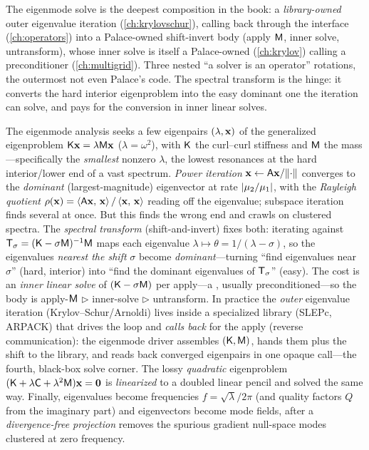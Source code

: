\begin{keyidea}
The eigenmode solve is the deepest composition in the book: a
\emph{library-owned} outer eigenvalue iteration (\cref{ch:krylovschur}), calling
back through the  interface (\cref{ch:operators}) into a Palace-owned
shift-invert body (apply $\mathsf{M}$, inner solve, untransform), whose inner solve is
itself a Palace-owned  (\cref{ch:krylov}) calling a
preconditioner (\cref{ch:multigrid}). Three nested ``a solver is an operator''
rotations, the outermost not even Palace's code. The spectral transform is the
hinge: it converts the hard interior eigenproblem into the easy dominant one the
iteration can solve, and pays for the conversion in inner linear solves.
\end{keyidea}

\summarysection
The eigenmode analysis seeks a few eigenpairs $(\lambda,\mathbf{x})$ of the generalized
eigenproblem $\mathsf{K}\mathbf{x}=\lambda\mathsf{M}\mathbf{x}$ ($\lambda=\omega^2$), with $\mathsf{K}$ the
curl--curl stiffness and $\mathsf{M}$ the mass---specifically the \emph{smallest}
nonzero $\lambda$, the lowest resonances at the hard interior/lower end of a vast
spectrum. \emph{Power iteration} $\mathbf{x}\leftarrow\mathsf{A}\mathbf{x}/\lVert\cdot\rVert$ converges
to the \emph{dominant} (largest-magnitude) eigenvector at rate $\lvert\mu_2/\mu_1\rvert$,
with the \emph{Rayleigh quotient} $\rho(\mathbf{x})=\left\langle \mathsf{A}\mathbf{x},\, \mathbf{x}\right\rangle/
\left\langle \mathbf{x},\, \mathbf{x}\right\rangle$ reading off the eigenvalue; subspace iteration finds several at
once. But this finds the wrong end and crawls on clustered spectra. The
\emph{spectral transform} (shift-and-invert) fixes both: iterating against
$\mathsf{T}_\sigma=(\mathsf{K}-\sigma\mathsf{M})^{-1}\mathsf{M}$ maps each eigenvalue
$\lambda\mapsto\theta=1/(\lambda-\sigma)$, so the eigenvalues \emph{nearest the
shift} $\sigma$ become \emph{dominant}---turning ``find eigenvalues near $\sigma$''
(hard, interior) into ``find the dominant eigenvalues of $\mathsf{T}_\sigma$'' (easy).
The cost is an \emph{inner linear solve} of $(\mathsf{K}-\sigma\mathsf{M})$ per apply---a
, usually preconditioned---so the body is apply-$\mathsf{M}$
$\rhd$ inner-solve $\rhd$ untransform. In practice the \emph{outer} eigenvalue
iteration (Krylov--Schur/Arnoldi) lives inside a specialized library (SLEPc,
ARPACK) that drives the loop and \emph{calls back} for the apply (reverse
communication): the eigenmode driver assembles $(\mathsf{K},\mathsf{M})$, hands them plus the
shift to the library, and reads back converged eigenpairs in one opaque call---the
fourth, black-box solve corner. The lossy \emph{quadratic} eigenproblem
$(\mathsf{K}+\lambda\mathsf{C}+\lambda^2\mathsf{M})\mathbf{x}=\mathbf 0$ is \emph{linearized} to a doubled
linear pencil and solved the same way. Finally, eigenvalues become frequencies
$f=\sqrt\lambda/2\pi$ (and quality factors $Q$ from the imaginary part) and
eigenvectors become mode fields, after a \emph{divergence-free projection} removes
the spurious gradient null-space modes clustered at zero frequency.

